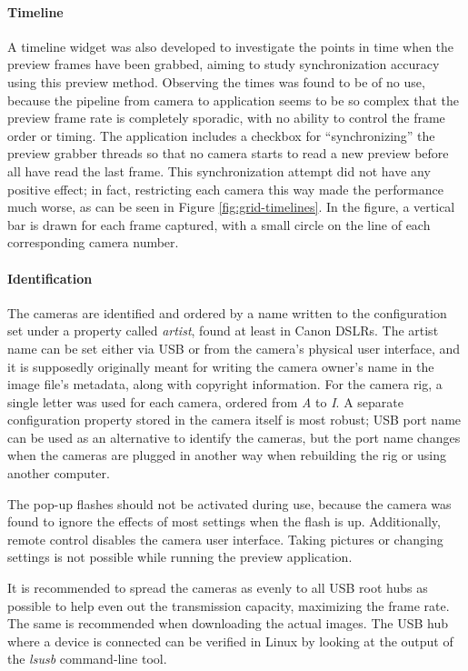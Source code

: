 \paragraph{Timeline}
A timeline widget was also developed to investigate the points in time when the preview frames have been grabbed, aiming to study synchronization accuracy using this preview method.
Observing the times was found to be of no use, because the pipeline from camera to application seems to be so complex that the preview frame rate is completely sporadic, with no ability to control the frame order or timing.
The application includes a checkbox for ``synchronizing'' the preview grabber threads so that no camera starts to read a new preview before all have read the last frame.
This synchronization attempt did not have any positive effect; in fact, restricting each camera this way made the performance much worse, as can be seen in Figure \ref{fig:grid-timelines}.
In the figure, a vertical bar is drawn for each frame captured, with a small circle on the line of each corresponding camera number.

\paragraph{Identification}
The cameras are identified and ordered by a name written to the configuration set under a property called \emph{artist}, found at least in Canon DSLRs.
The artist name can be set either via USB or from the camera's physical user interface, and it is supposedly originally meant for writing the camera owner's name in the image file's metadata, along with copyright information.
For the camera rig, a single letter was used for each camera, ordered from \emph{A} to \emph{I}.
A separate configuration property stored in the camera itself is most robust; USB port name can be used as an alternative to identify the cameras, but the port name changes when the cameras are plugged in another way when rebuilding the rig or using another computer.

The pop-up flashes should not be activated during use, because the camera was found to ignore the effects of most settings when the flash is up.
Additionally, remote control disables the camera user interface.
Taking pictures or changing settings is not possible while running the preview application.

It is recommended to spread the cameras as evenly to all USB root hubs as possible to help even out the transmission capacity, maximizing the frame rate.
The same is recommended when downloading the actual images.
The USB hub where a device is connected can be verified in Linux by looking at the output of the \emph{lsusb} command-line tool.

